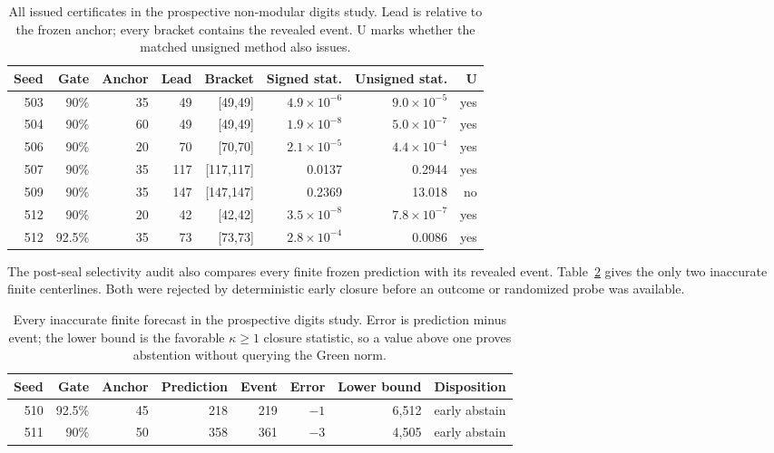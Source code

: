 \documentclass{article}
\begin{document}
\begin{table}[H]
\caption{All issued certificates in the prospective non-modular digits study.
Lead is relative to the frozen anchor; every bracket contains the
revealed event.  U marks whether the matched unsigned method also issues.}
\label{tab:digits-issued}
\centering
\small
\setlength{\tabcolsep}{4.5pt}
\begin{tabular}{rrrrrrrr}
\toprule
Seed & Gate & Anchor & Lead & Bracket & Signed stat. & Unsigned stat. & U \\
\midrule
503 & 90\%   & 35 & 49  & [49,49]   & $4.9{\times}10^{-6}$ & $9.0{\times}10^{-5}$ & yes \\
504 & 90\%   & 60 & 49  & [49,49]   & $1.9{\times}10^{-8}$ & $5.0{\times}10^{-7}$ & yes \\
506 & 90\%   & 20 & 70  & [70,70]   & $2.1{\times}10^{-5}$ & $4.4{\times}10^{-4}$ & yes \\
507 & 90\%   & 35 & 117 & [117,117] & 0.0137 & 0.2944 & yes \\
509 & 90\%   & 35 & 147 & [147,147] & 0.2369 & 13.018 & no \\
512 & 90\%   & 20 & 42  & [42,42]   & $3.5{\times}10^{-8}$ & $7.8{\times}10^{-7}$ & yes \\
512 & 92.5\% & 35 & 73  & [73,73]   & $2.8{\times}10^{-4}$ & 0.0086 & yes \\
\bottomrule
\end{tabular}
\end{table}

The post-seal selectivity audit also compares every finite frozen prediction
with its revealed event.  Table~\ref{tab:digits-inaccurate} gives the only two
inaccurate finite centerlines.  Both were rejected by deterministic early
closure before an outcome or randomized probe was available.

\begin{table}[H]
\caption{Every inaccurate finite forecast in the prospective digits study.
Error is prediction minus event; the lower bound is the favorable
$\kappa\ge1$ closure statistic, so a value above one proves abstention without
querying the Green norm.}
\label{tab:digits-inaccurate}
\centering
\small
\setlength{\tabcolsep}{5pt}
\begin{tabular}{rrrrrrrl}
\toprule
Seed & Gate & Anchor & Prediction & Event & Error & Lower bound & Disposition \\
\midrule
510 & 92.5\% & 45 & 218 & 219 & $-1$ & 6,512 & early abstain \\
511 & 90\%   & 50 & 358 & 361 & $-3$ & 4,505 & early abstain \\
\bottomrule
\end{tabular}
\end{table}
\end{document}
